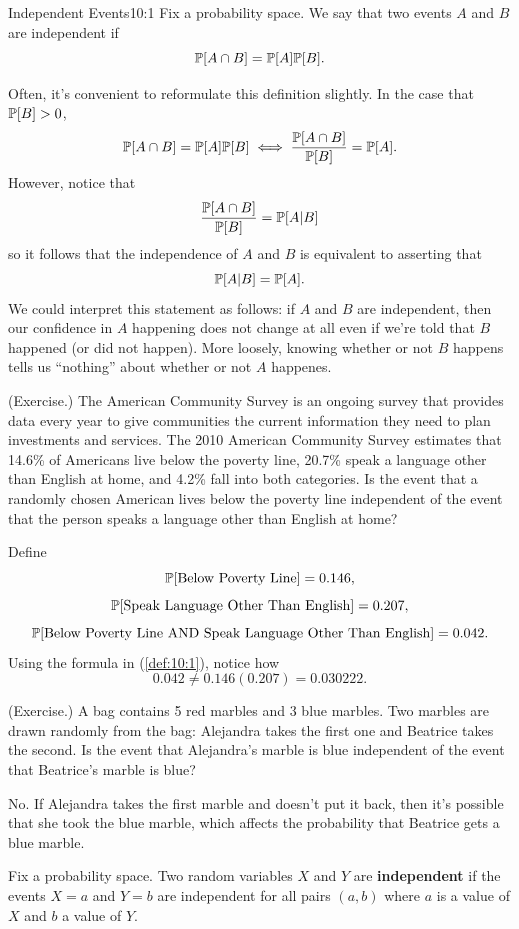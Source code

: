 \documentclass[letterpaper]{article}
\newcommand{\0}{\mathbf{0}}
\begin{document}
\begin{definition}{Independent Events}{10:1}
    Fix a probability space. We say that two events $A$ and $B$ are independent if 
    \[\mathbb{P}[A \cap B] = \mathbb{P}[A]\mathbb{P}[B].\]
\end{definition}
Often, it's convenient to reformulate this definition slightly. In the case that $\mathbb{P}[B] > 0$, \[\mathbb{P}[A \cap B] = \mathbb{P}[A] \mathbb{P}[B] \iff \frac{\mathbb{P}[A \cap B]}{\mathbb{P}[B]} = \mathbb{P}[A].\] However, notice that \[\frac{\mathbb{P}[A \cap B]}{\mathbb{P}[B]} = \mathbb{P}[A | B]\] so it follows that the independence of $A$ and $B$ is equivalent to asserting that \[\mathbb{P}[A | B] = \mathbb{P}[A].\] We could interpret this statement as follows: if $A$ and $B$ are independent, then our confidence in $A$ happening does not change at all even if we're told that $B$ happened (or did not happen). More loosely, knowing whether or not $B$ happens tells us ``nothing'' about whether or not $A$ happenes.

\begin{mdframed}
    (Exercise.) The American Community Survey is an ongoing survey that provides data every year to give communities the current information they need to plan investments and services. The 2010 American Community Survey estimates that 14.6\% of Americans live below the poverty line, 20.7\% speak a language other than English at home, and 4.2\% fall into both categories. Is the event that a randomly chosen American lives below the poverty line independent of the event that the person speaks a language other than English at home?

    \begin{mdframed}
        Define 
        \[\mathbb{P}[\text{Below Poverty Line}] = 0.146,\]
        \[\mathbb{P}[\text{Speak Language Other Than English}] = 0.207,\]
        \[\mathbb{P}[\text{Below Poverty Line AND Speak Language Other Than English}] = 0.042.\]
        Using the formula in (\ref{def:10:1}), notice how \[0.042 \neq 0.146(0.207) = 0.030222.\]
    \end{mdframed}
\end{mdframed}

\begin{mdframed}
    (Exercise.) A bag contains 5 red marbles and 3 blue marbles. Two marbles are drawn randomly from the bag: Alejandra takes the first one and Beatrice takes the second. Is the event that Alejandra's marble is blue independent of the event that Beatrice's marble is blue?

    \begin{mdframed}
        No. If Alejandra takes the first marble and doesn't put it back, then it's possible that she took the blue marble, which affects the probability that Beatrice gets a blue marble.
    \end{mdframed}
\end{mdframed}

\begin{definition}{}{}
    Fix a probability space. Two random variables $X$ and $Y$ are \textbf{independent} if the events $X = a$ and $Y = b$ are independent for all pairs $(a, b)$ where $a$ is a value of $X$ and $b$ a value of $Y$.
\end{definition}
\end{document}
